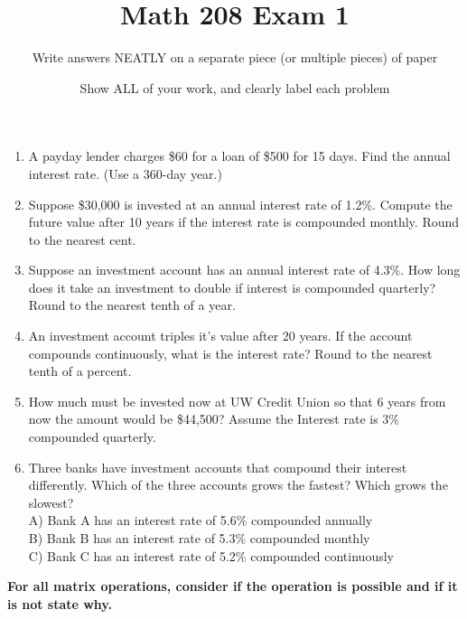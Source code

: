 \documentclass[12pt]{article}
\title{Math 208 Exam 1}
\author{Write answers NEATLY on a separate piece (or multiple pieces) of paper}
\date{Show ALL of your work, and clearly label each problem}
\begin{document}
\maketitle

\newpage
\begin{enumerate}
\item A payday lender charges \$60 for a loan of \$500 for 15 days. Find the annual interest rate. (Use a 360-day year.)

\item Suppose \$30,000 is invested at an annual interest rate of 1.2\%.  Compute the future value after 10 years if the interest rate is compounded monthly.  Round to the nearest cent.

\item Suppose an investment account has an annual interest rate of 4.3\%.  How long does it take an investment to double if interest is compounded quarterly?  Round to the nearest tenth of a year.

\item An investment account triples it's value after 20 years. If the account compounds continuously, what is the interest rate?  Round to the nearest tenth of a percent.

\item How much must be invested now at UW Credit Union so that 6 years from now the
amount would be \$44,500? Assume the Interest rate is 3\% compounded quarterly.

\item Three banks have investment accounts that compound their interest differently.  Which of the three accounts grows the fastest?  Which grows the slowest? \\
A) Bank A has an interest rate of 5.6\% compounded annually \\
B) Bank B has an interest rate of 5.3\% compounded monthly \\
C) Bank C has an interest rate of 5.2\% compounded continuously

\end{enumerate}
\textbf{For all matrix operations, consider if the operation is possible and if it is not state why.}
\end{document}
